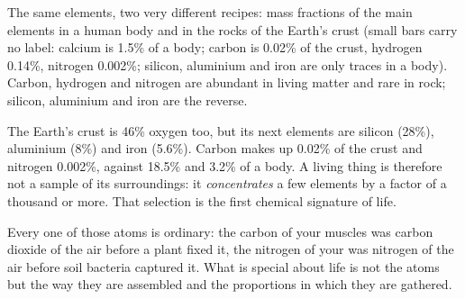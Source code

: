 \begin{omfigure}

{\small The same elements, two very different recipes: mass fractions of
the main elements in a human body and in the rocks of the Earth's crust
(small bars carry no label: calcium is 1.5\% of a body; carbon is
0.02\% of the crust, hydrogen 0.14\%, nitrogen 0.002\%; silicon,
aluminium and iron are only traces in a body). Carbon, hydrogen and nitrogen are abundant in living matter
and rare in rock; silicon, aluminium and iron are the reverse.}
\end{omfigure}

\begin{example}\label{ex:g10:chemistry-of-life:crust}
The Earth's crust is 46\% oxygen too, but its next elements are silicon
(28\%), aluminium (8\%) and iron (5.6\%). Carbon makes up 0.02\% of the
crust and nitrogen 0.002\%, against 18.5\% and 3.2\% of a body. A living
thing is therefore not a sample of its surroundings: it
\emph{concentrates} a few elements by a factor of a thousand or more.
That selection is the first chemical signature of life.
\end{example}

\begin{remark}\label{rem:g10:chemistry-of-life:origin}
Every one of those atoms is ordinary: the carbon of your muscles was
carbon dioxide of the air before a plant fixed it, the nitrogen of your
 was nitrogen of the air before soil bacteria captured it. What
is special about life is not the atoms but the way they are assembled
and the proportions in which they are gathered.
\end{remark}

